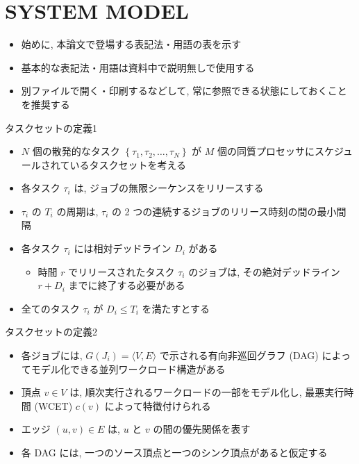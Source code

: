 
\section{SYSTEM MODEL}
\label{sec: system model}

\begin{frame}{}
    \begin{itemize}
        \item 始めに, 本論文で登場する表記法・用語の表を示す
        \item 基本的な表記法・用語は資料中で説明無しで使用する
        \item 別ファイルで開く・印刷するなどして, 常に参照できる状態にしておくことを推奨する
    \end{itemize}
\end{frame}



\begin{frame}{タスクセットの定義1}
    \begin{itemize}
        \item $N$ 個の散発的なタスク $\left\{\tau_{1}, \tau_{2}, \ldots, \tau_{N}\right\}$ が $M$ 個の同質プロセッサにスケジュールされているタスクセットを考える
        \item 各タスク $\tau_{i}$ は, ジョブの無限シーケンスをリリースする
        \item $\tau_{i}$ の $T_{i}$ の周期は, $\tau_{i}$ の 2 つの連続するジョブのリリース時刻の間の最小間隔
        \item 各タスク $\tau_{i}$ には相対デッドライン $D_{i}$ がある
              \begin{itemize}
                  \item 時間 $r$ でリリースされたタスク $\tau_{i}$ のジョブは, その絶対デッドライン $r+D_{i}$ までに終了する必要がある
              \end{itemize}
        \item 全てのタスク $\tau_{i}$ が $D_{i} \leq T_{i}$ を満たすとする
    \end{itemize}
\end{frame}

\begin{frame}{タスクセットの定義2}
    \begin{itemize}
        \item 各ジョブには, $G\left(J_{i}\right)=\langle V, E\rangle$ で示される有向非巡回グラフ (DAG) によってモデル化できる並列ワークロード構造がある
        \item 頂点 $v \in V$ は, 順次実行されるワークロードの一部をモデル化し, 最悪実行時間 (WCET) $c(v)$ によって特徴付けられる
        \item エッジ $(u, v) \in E$ は, $u$ と $v$ の間の優先関係を表す
        \item 各 DAG には, 一つのソース頂点と一つのシンク頂点があると仮定する
    \end{itemize}
\end{frame}

